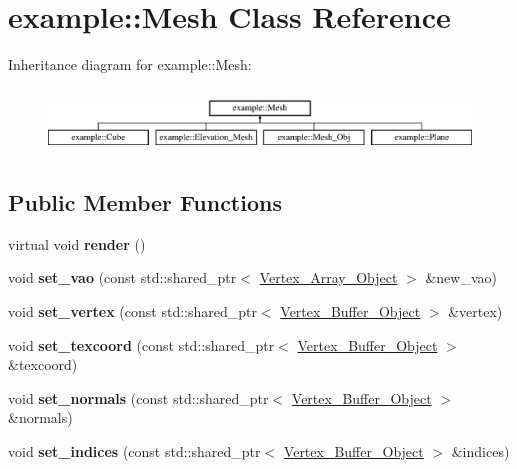 \hypertarget{classexample_1_1_mesh}{}\section{example\+::Mesh Class Reference}
\label{classexample_1_1_mesh}
Inheritance diagram for example\+::Mesh\+:\begin{figure}[H]
\begin{center}
\leavevmode
\includegraphics[height=1.728395cm]{classexample_1_1_mesh}
\end{center}
\end{figure}
\subsection*{Public Member Functions}
\begin{DoxyCompactItemize}
\item 
\mbox{\label{classexample_1_1_mesh_a2f58a336b1c73218078606a0da0569b9}} 
virtual void {\bfseries render} ()
\item 
\mbox{\label{classexample_1_1_mesh_abec70b631dd3c81704e63d01750e4c2f}} 
void {\bfseries set\+\_\+vao} (const std\+::shared\+\_\+ptr$<$ \mbox{\hyperlink{classexample_1_1_vertex___array___object}{Vertex\+\_\+\+Array\+\_\+\+Object}} $>$ \&new\+\_\+vao)
\item 
\mbox{\label{classexample_1_1_mesh_a5218261ca9616b8851c17b5f38e187bc}} 
void {\bfseries set\+\_\+vertex} (const std\+::shared\+\_\+ptr$<$ \mbox{\hyperlink{classexample_1_1_vertex___buffer___object}{Vertex\+\_\+\+Buffer\+\_\+\+Object}} $>$ \&vertex)
\item 
\mbox{\label{classexample_1_1_mesh_ad7a7d9e2541116c1a88a18776528b7b7}} 
void {\bfseries set\+\_\+texcoord} (const std\+::shared\+\_\+ptr$<$ \mbox{\hyperlink{classexample_1_1_vertex___buffer___object}{Vertex\+\_\+\+Buffer\+\_\+\+Object}} $>$ \&texcoord)
\item 
\mbox{\label{classexample_1_1_mesh_a8fb6818558216bf97889db5fc2ceb8f8}} 
void {\bfseries set\+\_\+normals} (const std\+::shared\+\_\+ptr$<$ \mbox{\hyperlink{classexample_1_1_vertex___buffer___object}{Vertex\+\_\+\+Buffer\+\_\+\+Object}} $>$ \&normals)
\item 
\mbox{\label{classexample_1_1_mesh_a523448862f3283b95cdb652ff7c1892f}} 
void {\bfseries set\+\_\+indices} (const std\+::shared\+\_\+ptr$<$ \mbox{\hyperlink{classexample_1_1_vertex___buffer___object}{Vertex\+\_\+\+Buffer\+\_\+\+Object}} $>$ \&indices)
\end{DoxyCompactItemize}
